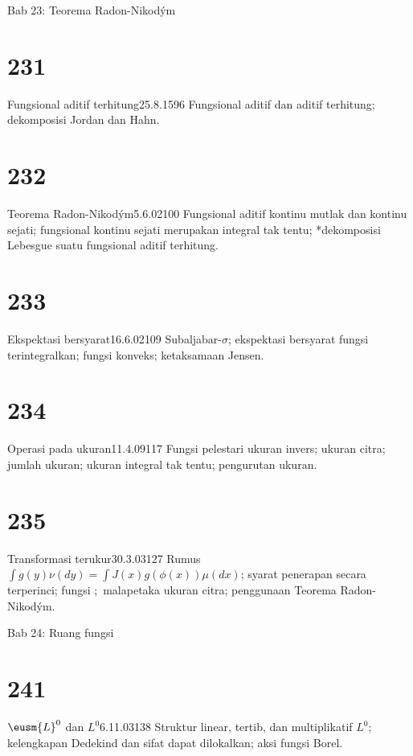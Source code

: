 
 Bab 23: Teorema Radon-Nikod\'ym


\section{231}{Fungsional aditif terhitung}{25.8.15}{96}{}
{Fungsional aditif dan aditif terhitung; dekomposisi Jordan dan Hahn.}

\section{232}{Teorema Radon-Nikod\'ym}{5.6.02}{100}{}
{Fungsional aditif kontinu mutlak dan kontinu sejati; fungsional
kontinu sejati merupakan integral tak tentu; *dekomposisi Lebesgue
suatu fungsional aditif terhitung.}

\section{233}{Ekspektasi bersyarat}{16.6.02}{109}{}
{Subaljabar-$\sigma$; ekspektasi bersyarat fungsi terintegralkan;
fungsi konveks; ketaksamaan Jensen.}

\section{234}{Operasi pada ukuran}{11.4.09}{117}{}
{Fungsi pelestari ukuran invers; ukuran citra; jumlah ukuran;
ukuran integral tak tentu; pengurutan ukuran.}

\section{235}{Transformasi terukur}{30.3.03}{127}{}
{Rumus ${\int}g(y)\nu(dy)={\int}J(x)g(\phi(x))\mu(dx)$;
syarat penerapan secara terperinci; fungsi \imp;\ malapetaka ukuran
citra; penggunaan Teorema Radon-Nikod\'ym.}


 Bab 24:  Ruang fungsi


\section{241}{$\eusm{L}^0$ dan $L^0$}{6.11.03}{138}{}
{Struktur linear, tertib, dan multiplikatif $L^0$; kelengkapan Dedekind
dan sifat dapat dilokalkan; aksi fungsi Borel.}

